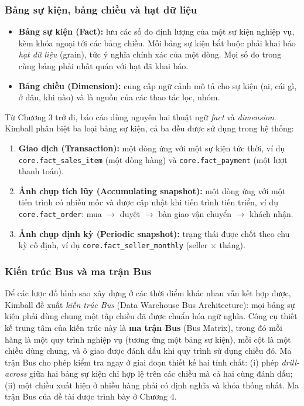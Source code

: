 \subsubsection*{Bảng sự kiện, bảng chiều và hạt dữ liệu}
\begin{itemize}
    \item \textbf{Bảng sự kiện (Fact):} lưu các số đo định lượng của một sự kiện nghiệp vụ, kèm khóa ngoại tới các bảng chiều. Mỗi bảng sự kiện bắt buộc phải khai báo \emph{hạt dữ liệu} (grain), tức ý nghĩa chính xác của một dòng. Mọi số đo trong cùng bảng phải nhất quán với hạt đã khai báo.
    \item \textbf{Bảng chiều (Dimension):} cung cấp ngữ cảnh mô tả cho sự kiện (ai, cái gì, ở đâu, khi nào) và là nguồn của các thao tác lọc, nhóm.
\end{itemize}
Từ Chương 3 trở đi, báo cáo dùng nguyên hai thuật ngữ \emph{fact} và \emph{dimension}. Kimball phân biệt ba loại bảng sự kiện, cả ba đều được sử dụng trong hệ thống:
\begin{enumerate}
    \item \textbf{Giao dịch (Transaction):} một dòng ứng với một sự kiện tức thời, ví dụ \texttt{core.fact\_sales\_item} (một dòng hàng) và \texttt{core.fact\_payment} (một lượt thanh toán).
    \item \textbf{Ảnh chụp tích lũy (Accumulating snapshot):} một dòng ứng với một tiến trình có nhiều mốc và được cập nhật khi tiến trình tiến triển, ví dụ \texttt{core.fact\_order}: mua $\rightarrow$ duyệt $\rightarrow$ bàn giao vận chuyển $\rightarrow$ khách nhận.
    \item \textbf{Ảnh chụp định kỳ (Periodic snapshot):} trạng thái được chốt theo chu kỳ cố định, ví dụ \texttt{core.fact\_seller\_monthly} (seller $\times$ tháng).
\end{enumerate}

\subsubsection*{Kiến trúc Bus và ma trận Bus}
Để các lược đồ hình sao xây dựng ở các thời điểm khác nhau vẫn kết hợp được, Kimball đề xuất \emph{kiến trúc Bus} (Data Warehouse Bus Architecture): mọi bảng sự kiện phải dùng chung một tập chiều đã được chuẩn hóa ngữ nghĩa. Công cụ thiết kế trung tâm của kiến trúc này là \textbf{ma trận Bus} (Bus Matrix), trong đó mỗi hàng là một quy trình nghiệp vụ (tương ứng một bảng sự kiện), mỗi cột là một chiều dùng chung, và ô giao được đánh dấu khi quy trình sử dụng chiều đó. Ma trận Bus cho phép kiểm tra ngay ở giai đoạn thiết kế hai tính chất: (i) phép \emph{drill-across} giữa hai bảng sự kiện chỉ hợp lệ trên các chiều mà cả hai cùng đánh dấu; (ii) một chiều xuất hiện ở nhiều hàng phải có định nghĩa và khóa thống nhất. Ma trận Bus của đề tài được trình bày ở Chương 4.

